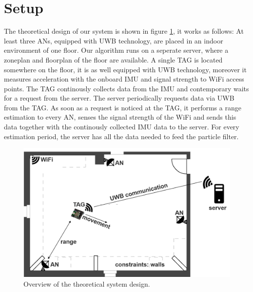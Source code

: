 
\section{Setup}
The theoretical design of our system is shown in figure \ref{fig:system_design}, it works as follows:
At least three ANs, equipped with UWB technology, are placed in an indoor environment of one floor. Our algorithm runs on a seperate server, where a zoneplan and floorplan of the floor are available. A single TAG is located somewhere on the floor, it is as well equipped with UWB technology, moreover it measures acceleration with the onboard IMU and signal strength to WiFi access points. The TAG continously collects data from the IMU and contemporary waits for a request from the server. The server periodically requests data via UWB from the TAG. As soon as a request is noticed at the TAG, it performs a range estimation to every AN, senses the signal strength of the WiFi and sends this data together with the continously collected IMU data to the server.
For every estimation period, the server has all the data needed to feed the particle filter.

\begin{figure}[th]
\centering
\includegraphics[width=1.0\textwidth]{Figures/system_design}
\decoRule
\caption[System design]{Overview of the theoretical system design.}
\label{fig:system_design}
\end{figure}


